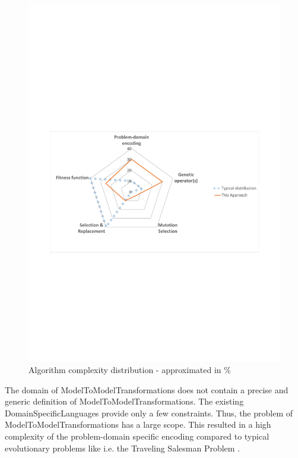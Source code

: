 \begin{figure}[!ht]
	\centering
	\includegraphics[scale=0.7, trim=2cm 9.3cm 2cm 10.8cm, clip=true]{Images/FocusDistribution.pdf} %
	\caption{Algorithm complexity distribution - approximated in \%}
	\label{figFocusDistribution}
\end{figure}

The domain of \glspl{ModelToModelTransformation} does not contain a precise and generic definition of \glspl{ModelToModelTransformation}. The existing \glspl{DomainSpecificLanguage} provide only a few constraints.  Thus, the problem of \glspl{ModelToModelTransformation} has a large scope. This resulted in a high complexity of the problem-domain specific encoding compared to typical evolutionary problems like i.e. the Traveling Salesman Problem \cite{Cickova2008}.

